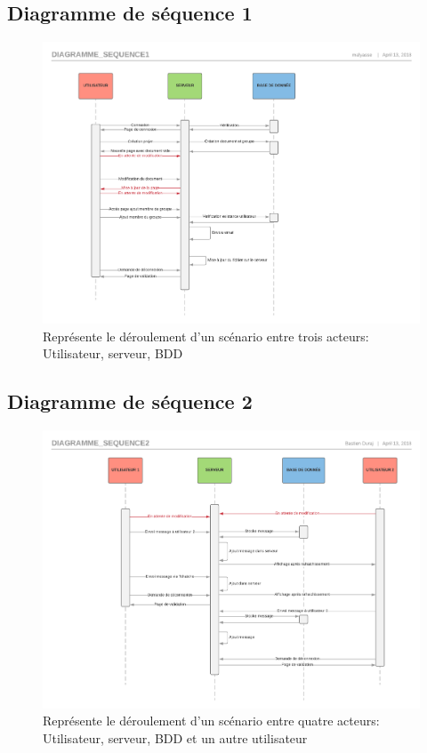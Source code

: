 \documentclass[11pt,a4paper]{article}
\begin{document}
\subsection{Diagramme de séquence 1}
\begin{figure}[!h]
\includegraphics[scale=0.7]{Image/Diagramme_sequence1.pdf}
\caption{Représente le déroulement d'un scénario entre trois acteurs: Utilisateur, serveur, BDD}
\end{figure}
\newpage
\subsection{Diagramme de séquence 2}
\begin{figure}[!h]
\centering
\includegraphics[scale=0.6]{Image/Diagramme_sequence2.pdf}
\caption{Représente le déroulement d'un scénario entre quatre acteurs: Utilisateur, serveur, BDD et un autre utilisateur}
\end{figure}
\newpage
\end{document}
